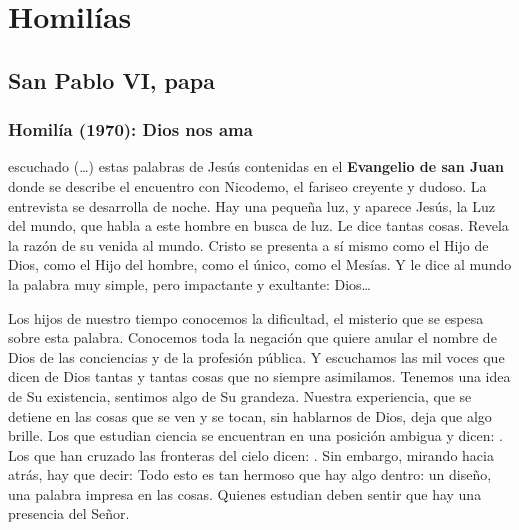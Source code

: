 \newsection
\section{Homilías}

\subsection{San Pablo VI, papa}

\subsubsection{Homilía (1970): Dios nos ama}


\begin{body}
 escuchado (\ldots) estas palabras  de Jesús contenidas en el \textbf{Evangelio de san Juan} donde se describe el encuentro con Nicodemo, el fariseo creyente y dudoso. La entrevista se desarrolla de noche. Hay una pequeña luz, y aparece Jesús, la Luz del mundo, que habla a este hombre en busca de luz. Le dice tantas cosas. Revela la razón de su venida al mundo. Cristo se presenta a sí mismo como el Hijo de Dios, como el Hijo del hombre, como el único, como el Mesías. Y le dice al mundo la palabra muy simple, pero impactante y exultante: Dios\ldots

Los hijos de nuestro tiempo conocemos la dificultad, el misterio que se espesa sobre esta palabra. Conocemos toda la negación que quiere anular el nombre de Dios de las conciencias y de la profesión pública. Y escuchamos las mil voces que dicen de Dios tantas y tantas cosas que no siempre asimilamos. Tenemos una idea de Su existencia, sentimos algo de Su grandeza. Nuestra experiencia, que se detiene en las cosas que se ven y se tocan, sin hablarnos de Dios, deja que algo brille. Los que estudian ciencia se encuentran en una posición ambigua y dicen: . Los que han cruzado las fronteras del cielo dicen: . Sin embargo, mirando hacia atrás, hay que decir: Todo esto es tan hermoso que hay algo dentro: un diseño, una palabra impresa en las cosas. Quienes estudian deben sentir que hay una presencia del Señor.


\end{body}
